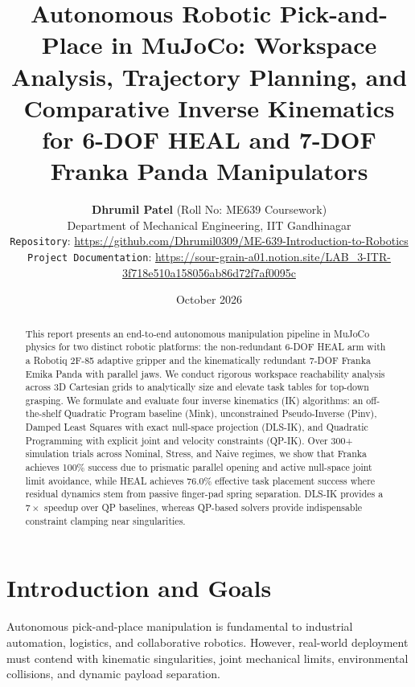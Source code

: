 \documentclass[10pt,twocolumn]{article}
\title{\textbf{Autonomous Robotic Pick-and-Place in MuJoCo: Workspace Analysis, Trajectory Planning, and Comparative Inverse Kinematics for 6-DOF HEAL and 7-DOF Franka Panda Manipulators}}
\author{\textbf{Dhrumil Patel} (Roll No: ME639 Coursework) \\
Department of Mechanical Engineering, IIT Gandhinagar \\
\texttt{Repository}: \url{https://github.com/Dhrumil0309/ME-639-Introduction-to-Robotics} \\
\texttt{Project Documentation}: \url{https://sour-grain-a01.notion.site/LAB_3-ITR-3f718e510a158056ab86d72f7af0095c}}
\date{October 2026}
\begin{document}
\maketitle

\begin{abstract}
This report presents an end-to-end autonomous manipulation pipeline in MuJoCo physics for two distinct robotic platforms: the non-redundant 6-DOF HEAL arm with a Robotiq 2F-85 adaptive gripper and the kinematically redundant 7-DOF Franka Emika Panda with parallel jaws. We conduct rigorous workspace reachability analysis across 3D Cartesian grids to analytically size and elevate task tables for top-down grasping. We formulate and evaluate four inverse kinematics (IK) algorithms: an off-the-shelf Quadratic Program baseline (Mink), unconstrained Pseudo-Inverse (Pinv), Damped Least Squares with exact null-space projection (DLS-IK), and Quadratic Programming with explicit joint and velocity constraints (QP-IK). Over 300+ simulation trials across Nominal, Stress, and Naive regimes, we show that Franka achieves 100\% success due to prismatic parallel opening and active null-space joint limit avoidance, while HEAL achieves 76.0\% effective task placement success where residual dynamics stem from passive finger-pad spring separation. DLS-IK provides a $7\times$ speedup over QP baselines, whereas QP-based solvers provide indispensable constraint clamping near singularities.
\end{abstract}

\section{Introduction and Goals}
Autonomous pick-and-place manipulation is fundamental to industrial automation, logistics, and collaborative robotics. However, real-world deployment must contend with kinematic singularities, joint mechanical limits, environmental collisions, and dynamic payload separation. 
\end{document}

